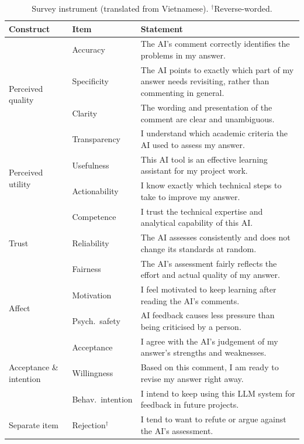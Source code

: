 \documentclass[runningheads]{llncs}
\begin{document}
\begin{table}[t]
\caption{Survey instrument (translated from Vietnamese). $^\dagger$Reverse-worded.}
\label{tab:instrument}
\centering\scriptsize
\setlength\tabcolsep{3pt}
\begin{tabular}{@{}p{17mm}p{20mm}p{79mm}@{}}
\toprule
Construct & Item & Statement \\
\midrule
\multirow{4}{17mm}{Perceived quality}
 & Accuracy & The AI's comment correctly identifies the problems in my answer. \\
 & Specificity & The AI points to exactly which part of my answer needs revisiting, rather than commenting in general. \\
 & Clarity & The wording and presentation of the comment are clear and unambiguous. \\
 & Transparency & I understand which academic criteria the AI used to assess my answer. \\
\midrule
\multirow{2}{17mm}{Perceived utility}
 & Usefulness & This AI tool is an effective learning assistant for my project work. \\
 & Actionability & I know exactly which technical steps to take to improve my answer. \\
\midrule
\multirow{3}{17mm}{Trust}
 & Competence & I trust the technical expertise and analytical capability of this AI. \\
 & Reliability & The AI assesses consistently and does not change its standards at random. \\
 & Fairness & The AI's assessment fairly reflects the effort and actual quality of my answer. \\
\midrule
\multirow{2}{17mm}{Affect}
 & Motivation & I feel motivated to keep learning after reading the AI's comments. \\
 & Psych.\ safety & AI feedback causes less pressure than being criticised by a person. \\
\midrule
\multirow{3}{17mm}{Acceptance \& intention}
 & Acceptance & I agree with the AI's judgement of my answer's strengths and weaknesses. \\
 & Willingness & Based on this comment, I am ready to revise my answer right away. \\
 & Behav.\ intention & I intend to keep using this LLM system for feedback in future projects. \\
\midrule
Separate item & Rejection$^\dagger$ & I tend to want to refute or argue against the AI's assessment. \\
\bottomrule
\end{tabular}
\end{table}
\end{document}
